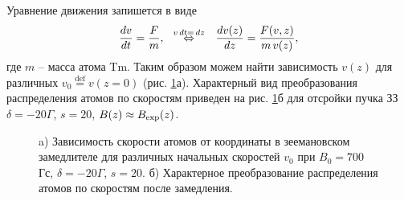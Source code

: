 Уравнение движения запишется в виде
\begin{equation}
    \frac{d v}{d t} = \frac{F}{m},
    \hspace{0.25cm} \overset{v \, d t = \, d z}{\Leftrightarrow}  \hspace{0.25cm}
    \frac{d v(z)}{d z} = \frac{F(v, z)}{m \, v(z)},
\end{equation}
где $m$ -- масса атома Tm. Таким образом можем найти зависимость $v(z)$ для различных $v_0 \overset{\mathrm{def}}{=} v(z=0)$ (рис. \ref{fig:vZz}а). Характерный вид преобразования распределения атомов по скоростям приведен на рис. \ref{fig:vZz}б для отсройки пучка ЗЗ $\delta = -20\Gamma$, $s=20$, $B(z) \approx B_{\textnormal{exp}}(z)$. 
\begin{figure}[ht]
    \centering
    \hspace{5 mm} 
    \vspace{-3mm}
    \caption{a) Зависимость скорости атомов от координаты в зеемановском замедлителе  для различных начальных скоростей $v_0$ при $B_0 = 700\,$Гс, $\delta=-20\Gamma$, $s=20$. б) Характерное преобразование распределения атомов по скоростям после замедления. }
    \label{fig:vZz}
\end{figure}

